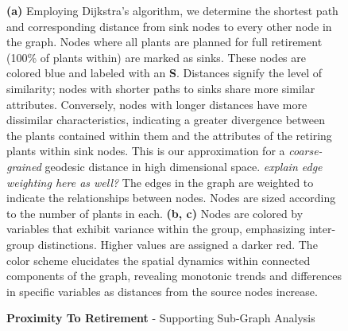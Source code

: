 \begin{figure}[htb]
    \caption{\textbf{Proximity To Retirement} - Supporting Sub-Graph Analysis}
    \medskip
    \footnotesize
    \textbf{(a)} Employing Dijkstra's algorithm, we determine the shortest path and corresponding distance from sink nodes to every other node in the graph. Nodes where all plants are planned for full retirement (100\% of plants within) are marked as sinks. These nodes are colored blue and labeled with an \textbf{S}. Distances signify the level of similarity; nodes with shorter paths to sinks share more similar attributes. Conversely, nodes with longer distances have more dissimilar characteristics, indicating a greater divergence between the plants contained within them and the attributes of the retiring plants within sink nodes.  This is our approximation for a \textit{coarse-grained} geodesic distance in high dimensional space. \textit{explain edge weighting here as well?}
    The edges in the graph are weighted to indicate the relationships between nodes. Nodes are sized according to the number of plants in each. 
    \textbf{(b, c)} Nodes are colored by variables that exhibit variance within the group, emphasizing inter-group distinctions. Higher values are assigned a darker red. The color scheme elucidates the spatial dynamics within connected components of the graph, revealing monotonic trends and differences in specific variables as distances from the source nodes increase.
    \label{fig:group3-shortestPath-graphs}
\end{figure}